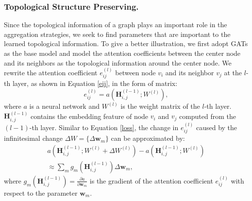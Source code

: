 \documentclass[letterpaper]{article} %
\begin{document}
\subsubsection{Topological Structure Preserving.}
Since the topological information of a graph plays 
an important role in the aggregation strategies, 
we seek to find parameters that
are important to the learned topological information.
To give a better illustration,
we first adopt GATs as the base model and model
the attention coefficients between the center node and its neighbors as the topological information around the center node.
We rewrite the attention coefficient $e_{ij}^{(l)}$ between node $v_i$ and its neighbor $v_j$ at the $l$-th layer, as shown in Equation \ref{eij}, in the form of matrix:
\begin{equation}
\label{attmat}
  e_{ij}^{(l)} = a(\boldsymbol{H}_{i,j}^{(l-1)}; W^{(l)}),
\end{equation}
\noindent where $a$ is a neural network and $W^{(l)}$ is the weight matrix of the $l$-th layer.
$\boldsymbol{H}_{i,j}^{(l-1)}$ contains the embedding feature of node $v_i$ and $v_j$ computed from the $(l-1)$-th layer.
Similar to Equation \ref{loss}, the change in $e_{ij}^{(l)}$ caused by the infinitesimal change $\Delta W=\{ \Delta \boldsymbol{w}_m \}$ 
can be approximated by:
\begin{equation}
\begin{split}
\label{attsen}
  a(\boldsymbol{H}_{i,j}^{(l-1)}; W^{(l)} + \Delta W^{(l)})
  -a(\boldsymbol{H}_{i,j}^{(l-1)}; W^{(l)}) \\
  \approx \sum_m g_m (\boldsymbol{H}_{i,j}^{(l-1)}) \Delta \boldsymbol{w}_m,
\end{split}
\end{equation}
\noindent where $g_m (\boldsymbol{H}_{i,j}^{(l-1)})=\frac{\partial a}{\partial{\boldsymbol{w}_m}}$
is the gradient of the attention coefficient $e_{ij}^{(l)}$ 
with respect to the parameter $\boldsymbol{w}_m$.
\end{document}
